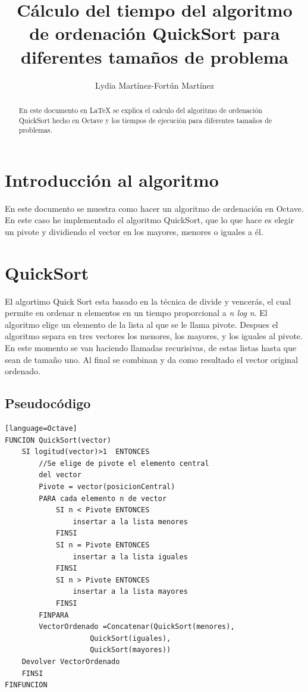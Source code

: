 \documentclass[a4,12pt]{article}
\title{Cálculo del tiempo del algoritmo de ordenación QuickSort para diferentes tamaños de problema}
\author{Lydia Martínez-Fortún Martínez}
\begin{document}
\maketitle



\begin{abstract}
En este documento en \LaTeX{} se explica el calculo del algoritmo de ordenación QuickSort hecho en Octave y los tiempos de ejecución para diferentes tamaños de problemas.
\end{abstract}

\tableofcontents

\newpage

\section{Introducción al algoritmo}

En este documento se muestra como hacer un algoritmo de ordenación en Octave. En este caso he implementado el algoritmo QuickSort, que lo que hace es elegir un pivote y dividiendo el vector en los mayores, menores o iguales a él.



\section{QuickSort}

El algortimo Quick Sort esta basado en la técnica de divide y vencerás, el cual permite en ordenar n elementos en un tiempo proporcional a \emph{n log n}. El algoritmo elige un elemento de la lista al que se le llama pivote. Despues el algoritmo separa en tres vectores los menores, los mayores, y los iguales al pivote. En este momento se van haciendo llamadas recurisivas, de estas listas hasta que sean de tamaño uno. Al final se combinan y da como resultado el vector original ordenado.


\subsection{Pseudocódigo}
\lstset{language=Pascal}
\begin{lstlisting}[frame=single][language=Octave]
FUNCION QuickSort(vector)
	SI logitud(vector)>1  ENTONCES
		//Se elige de pivote el elemento central 
		del vector
		Pivote = vector(posicionCentral)
		PARA cada elemento n de vector
			SI n < Pivote ENTONCES
				insertar a la lista menores
			FINSI
			SI n = Pivote ENTONCES
				insertar a la lista iguales
			FINSI
			SI n > Pivote ENTONCES
				insertar a la lista mayores
			FINSI
		FINPARA
		VectorOrdenado =Concatenar(QuickSort(menores), 
					QuickSort(iguales), 
					QuickSort(mayores))	
	Devolver VectorOrdenado	
	FINSI
FINFUNCION

\end{lstlisting}
\end{document}
